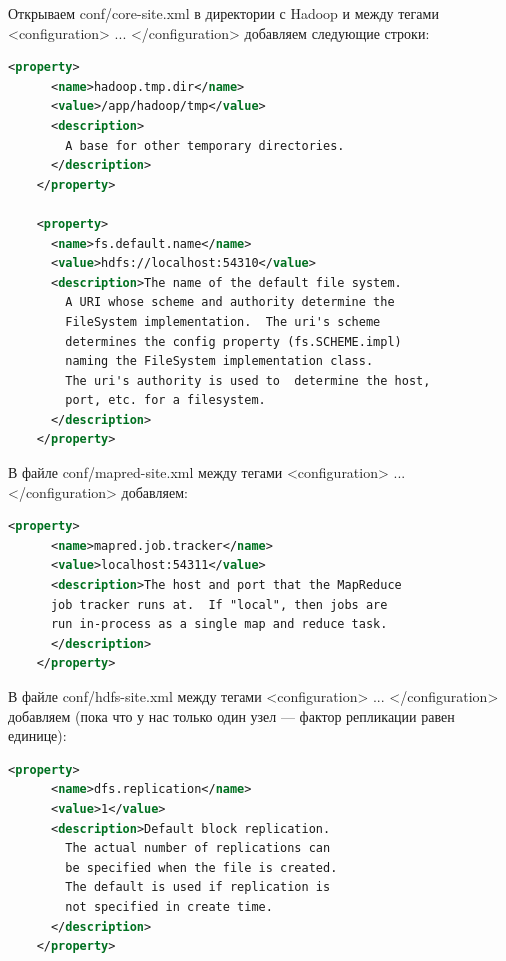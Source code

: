 \documentclass[12pt,a4paper]{extarticle} %
\begin{document}
\noindent Открываем conf/core-site.xml в директории с Hadoop и между тегами <configuration> ... </configuration> добавляем следующие строки:
\begin{lstlisting}[language=xml]
    <property>
      <name>hadoop.tmp.dir</name>
      <value>/app/hadoop/tmp</value>
      <description>
        A base for other temporary directories.
      </description>
    </property>
    
    <property>
      <name>fs.default.name</name>
      <value>hdfs://localhost:54310</value>
      <description>The name of the default file system. 
        A URI whose scheme and authority determine the 
        FileSystem implementation.  The uri's scheme
        determines the config property (fs.SCHEME.impl) 
        naming the FileSystem implementation class.  
        The uri's authority is used to  determine the host,
        port, etc. for a filesystem.
      </description>
    </property>
\end{lstlisting}

\noindent В файле conf/mapred-site.xml между тегами <configuration> ... </configuration> добавляем:
\begin{lstlisting}[language=xml]
    <property>
      <name>mapred.job.tracker</name>
      <value>localhost:54311</value>
      <description>The host and port that the MapReduce 
      job tracker runs at.  If "local", then jobs are 
      run in-process as a single map and reduce task.
      </description>
    </property>
\end{lstlisting}

\noindent В файле conf/hdfs-site.xml между тегами <configuration> ... </configuration> добавляем (пока что у нас только один узел --- фактор репликации равен единице):
\begin{lstlisting}[language=xml]
    <property>
      <name>dfs.replication</name>
      <value>1</value>
      <description>Default block replication.
        The actual number of replications can
        be specified when the file is created.  
        The default is used if replication is 
        not specified in create time.
      </description>
    </property>
\end{lstlisting}
\end{document}
